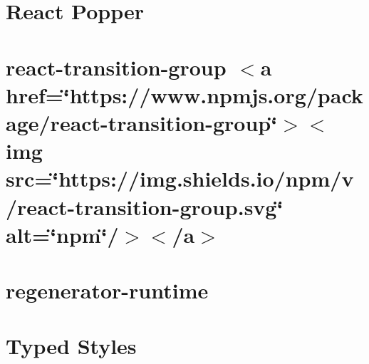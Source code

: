 \let\mypdfximage\pdfximage\def\pdfximage{\immediate\mypdfximage}\documentclass[twoside]{book}
\newcommand{\+}{\discretionary{\mbox{\scriptsize$\hookleftarrow$}}{}{}}
\begin{document}
\chapter{React Popper}
\label{md__c___users_zhart__one_drive__desktop_school_capstone_workspace_capstone_flight_risk_assesmentdd710f79abee496647b9ce1fcef0c476}

\chapter{react-\/transition-\/group $<$a href=\char`\"{}https\+://www.\+npmjs.\+org/package/react-\/transition-\/group\char`\"{}$>$$<$img src=\char`\"{}https\+://img.\+shields.\+io/npm/v/react-\/transition-\/group.\+svg\char`\"{} alt=\char`\"{}npm\char`\"{}/$>$$<$/a$>$}
\label{md__c___users_zhart__one_drive__desktop_school_capstone_workspace_capstone_flight_risk_assesmentcc437a900b448ad2a84f86c96b40ea51}

\chapter{regenerator-\/runtime}
\label{md__c___users_zhart__one_drive__desktop_school_capstone_workspace_capstone_flight_risk_assesmentfb300b07e3545bbc6d7d7f990f17b5dd}

\chapter{Typed Styles}
\label{md__c___users_zhart__one_drive__desktop_school_capstone_workspace_capstone_flight_risk_assesment678552e7587c35d902ece2068c21cf40}

\end{document}
